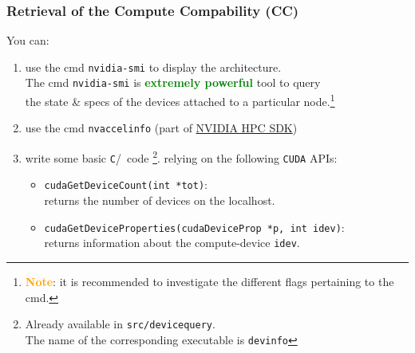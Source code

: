 \begin{frame}
	\frametitle{Retrieval of the Compute Compability (CC)}
      You can:	
      \begin{enumerate} 
	      \item use the cmd \texttt{nvidia-smi} to display the architecture.\\
		      The cmd \texttt{nvidia-smi} is \textbf{\textcolor{green}{extremely powerful}} tool to query\\ 
		      the state \& specs of the devices attached to a particular node.\footnote{\textbf{\textcolor{orange}{Note}}: it is 
		      recommended to
		      investigate the different flags pertaining to the cmd.}
              \item use the cmd \texttt{nvaccelinfo}
                (part of \href{https://developer.nvidia.com/hpc-sdk}{NVIDIA HPC SDK})		        
	      \item write some basic \texttt{C}/\CC\ code \footnote{Already available in \texttt{src/devicequery}.\\
		      \hspace{4ex}The name of the corresponding executable is \texttt{devinfo}}. 
   	    relying on the following \texttt{CUDA} APIs:\\
   	      \begin{itemize}    
  	         \item \lstinline[style=MyCudaStyle]|cudaGetDeviceCount(int *tot)|: \\
	  	       returns the number of devices on the localhost.
   	         \item \lstinline[style=MyCudaStyle]|cudaGetDeviceProperties(cudaDeviceProp *p, int idev)|: \\
		       returns information about the compute-device \lstinline[style=MyCudaStyle]|idev|.
              \end{itemize}
      \end{enumerate}
\end{frame}	


